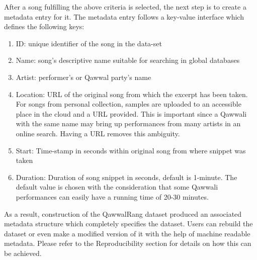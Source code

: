 \documentclass{article}
\begin{document}
After a song fulfilling the above criteria is selected, the next step is to create a metadata entry for it. The metadata entry follows a key-value interface which defines the following keys:
\begin{enumerate}
\item ID: unique identifier of the song in the data-set
\item Name: song's descriptive name suitable for searching in global databases
\item Artist: performer's or Qawwal party's name
\item Location: URL of the original song from which the excerpt has been taken. For songs from personal collection, samples are uploaded to an accessible place in the cloud and a URL provided. This is important since a Qawwali with the same name may bring up performances from many artists in an online search. Having a URL removes this ambiguity.
\item Start: Time-stamp in seconds within original song from where snippet was taken
\item Duration: Duration of song snippet in seconds, default is 1-minute. The default value is chosen with the consideration that some Qawwali performances can easily have a running time of 20-30 minutes.
\end{enumerate}

As a result, construction of the QawwalRang dataset produced an associated metadata structure which completely specifies the dataset. Users can rebuild the dataset or even make a modified version of it with the help of machine readable metadata. Please refer to the Reproducibility section for details on how this can be achieved.
\end{document}
